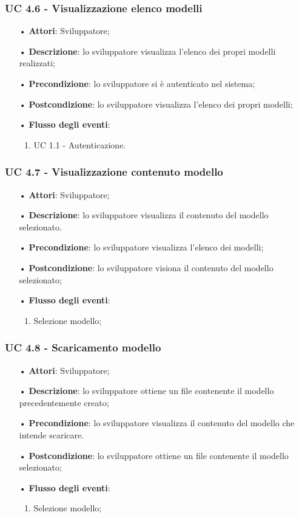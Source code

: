 \subsubsection{UC 4.6 - Visualizzazione elenco modelli}
\begin{itemize}
\item[•]\textbf{Attori}: Sviluppatore;
\item[•]\textbf{Descrizione}: lo sviluppatore visualizza l'elenco dei propri modelli realizzati;
\item[•]\textbf{Precondizione}: lo sviluppatore si è autenticato nel sistema;
\item[•]\textbf{Postcondizione}: lo sviluppatore visualizza l'elenco dei propri modelli;
\item[•]\textbf{Flusso degli eventi}: 
	\begin{enumerate}
	\item UC 1.1 - Autenticazione.
	\end{enumerate}
\end{itemize}


\subsubsection{UC 4.7 - Visualizzazione contenuto modello} 
\begin{itemize}
\item[•]\textbf{Attori}: Sviluppatore;
\item[•]\textbf{Descrizione}: lo sviluppatore visualizza il contenuto del modello selezionato.
\item[•]\textbf{Precondizione}: lo sviluppatore visualizza l'elenco dei modelli;
\item[•]\textbf{Postcondizione}: lo sviluppatore visiona il contenuto del modello selezionato;
\item[•]\textbf{Flusso degli eventi}: 
	\begin{enumerate}
		\item Selezione modello;
	\end{enumerate}
\end{itemize}

\subsubsection{UC 4.8 - Scaricamento modello}
\begin{itemize}
\item[•]\textbf{Attori}: Sviluppatore;
\item[•]\textbf{Descrizione}: lo sviluppatore ottiene un file contenente il modello precedentemente creato;
\item[•]\textbf{Precondizione}: lo sviluppatore visualizza il contenuto del modello che intende scaricare.
\item[•]\textbf{Postcondizione}: lo sviluppatore ottiene un file contenente il modello selezionato;
\item[•]\textbf{Flusso degli eventi}: 
	\begin{enumerate}
		\item Selezione modello;
	\end{enumerate}
\end{itemize}

